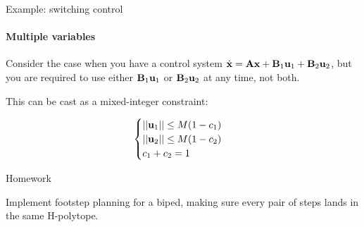\documentclass{beamer}
\begin{document}
\begin{frame}{Example: switching control}
	\framesubtitle{Multiple variables}
	\begin{flushleft}
		
		Consider the case when you have a control system $\dot{\mathbf{x}} =\mathbf{A}\mathbf{x} + \mathbf{B}_1\mathbf{u}_1 + \mathbf{B}_2\mathbf{u}_2$, but you are required to use either $\mathbf{B}_1\mathbf{u}_1$ or $\mathbf{B}_2\mathbf{u}_2$ at any time, not both.
		
		\bigskip
		
		This can be cast as a mixed-integer constraint:
		
		\begin{equation}
			\begin{cases}
				||\mathbf{u}_1|| \leq M (1 - c_1) \\
				||\mathbf{u}_2|| \leq M (1 - c_2) \\
				c_1 + c_2 = 1
			\end{cases}
		\end{equation}
		
	\end{flushleft}
\end{frame}




\begin{frame}{Homework}
\begin{flushleft}

Implement footstep planning for a biped, making sure every pair of steps lands in the same H-polytope.

\end{flushleft}
\end{frame}



\myqrframe
\end{document}
